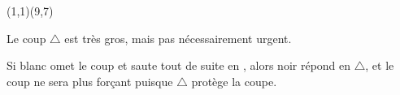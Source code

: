\documentclass[preview, border=0pt, varwidth=false]{standalone}
\begin{document}
	\setgounit{0.6cm} 
	
\parbox[c][14.65cm][c]{10.2cm}{
	\centering
	
	\begin{psgopartialboard}{(1,1)(9,7)}
		\pass
	\end{psgopartialboard}
	
	\vspace{1em}
	
	Le coup $\triangle$ est très gros, mais pas nécessairement urgent. 
	\vspace{1em}

	Si blanc omet le coup  et saute tout de suite en , alors noir répond en $\triangle$, et le coup  ne sera plus forçant puisque $\triangle$ protège la coupe. 
}
\end{document}
